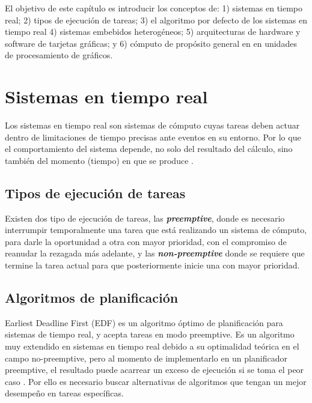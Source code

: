 

El objetivo de este capítulo es introducir los conceptos de: 1) sistemas en tiempo real; 2) tipos de ejecución de tareas; 3) el algoritmo por defecto de los sistemas en tiempo real 4) sistemas embebidos heterogéneos; 5) arquitecturas de hardware y software de tarjetas gráficas; y 6) cómputo de propósito general en en unidades de procesamiento de gráficos.
\section{Sistemas en tiempo real}\label{sec:sistr}

Los sistemas en tiempo real son sistemas de cómputo cuyas tareas deben actuar dentro de limitaciones de tiempo precisas ante eventos en su entorno. Por lo que el comportamiento del sistema depende, no solo del resultado del cálculo, sino también del momento (tiempo) en que se produce \cite{Buta2011}.

\subsection{Tipos de ejecución de tareas}

Existen dos tipo de ejecución de tareas, las \textit{\textbf{preemptive}}, donde es necesario interrumpir temporalmente una tarea que está realizando un sistema de cómputo, para darle la oportunidad a otra con mayor prioridad, con el compromiso de reanudar la rezagada más adelante, y las \textit{\textbf{non-preemptive} }donde se requiere que termine la tarea actual para que posteriormente inicie una con mayor prioridad.

\subsection{Algoritmos de planificación}

Earliest Deadline First (EDF) es un algoritmo óptimo de planificación para sistemas de tiempo real, y acepta tareas en modo preemptive. Es un algoritmo muy extendido en sistemas en tiempo real debido a su optimalidad teórica en el campo no-preemptive, pero al momento de implementarlo en un planificador preemptive, el resultado puede acarrear un exceso de ejecución si se toma el peor caso \cite{EmbSysDes}. Por ello es necesario buscar alternativas de algoritmos que tengan un mejor desempeño en tareas específicas.


